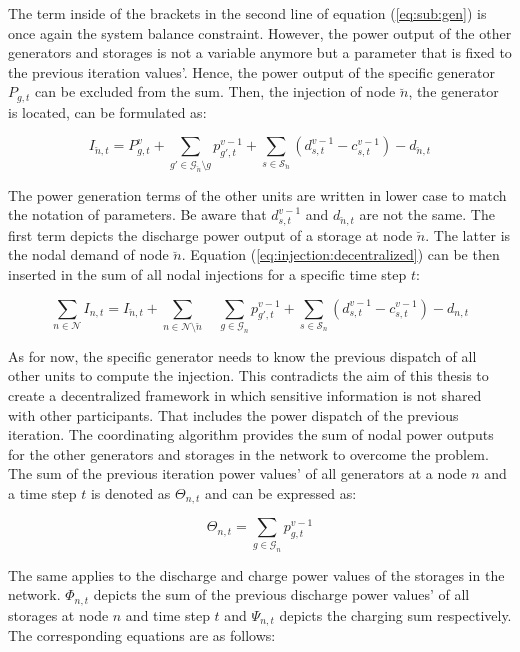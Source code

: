 The term inside of the brackets in the second line of equation (\ref{eq:sub:gen}) is once again the system balance constraint. However, the power output of the other generators and storages is not a variable anymore but a parameter that is fixed to the previous iteration values'. Hence, the power output of the specific generator $P_{g,t}$ can be excluded from the sum. Then, the injection of node $\breve{n}$, the generator is located, can be formulated as:
 
 \begin{equation}
	I_{\breve{n},t} = P_{g,t}^v + \sum_{g'\in\mathcal{G}_{\breve{n}} \setminus g}p_{g',t}^{v-1} + \sum_{s\in\mathcal{S}_{\breve{n}}}(d_{s,t}^{v-1}-c_{s,t}^{v-1})-d_{\breve{n},t}
	\label{eq:injection:decentralized}
\end{equation} 
 
 The power generation terms of the other units are written in lower case to match the notation of parameters. Be aware that $d_{s,t}^{v-1}$ and $d_{\breve{n},t}$ are not the same. The first term depicts the discharge power output of a storage at node $\breve{n}$. The latter is the nodal demand of node $\breve{n}$. Equation (\ref{eq:injection:decentralized}) can be then inserted in the sum of all nodal injections for a specific time step $t$:
 
 \begin{equation}
 	\sum_{n \in \mathcal{N}} I_{n,t} = I_{\breve{n},t} + \sum_{n \in \mathcal{N} \setminus \breve{n}} \quad \sum_{g\in\mathcal{G}_n}p_{g',t}^{v-1} + \sum_{s\in\mathcal{S}_n}(d_{s,t}^{v-1}-c_{s,t}^{v-1})-d_{n,t}
 \end{equation}
 
 As for now, the specific generator needs to know the previous dispatch of all other units to compute the injection. This contradicts the aim of this thesis to create a decentralized framework in which sensitive information is not shared with other participants. That includes the power dispatch of the previous iteration. The coordinating algorithm provides the sum of nodal power outputs for the other generators and storages in the network to overcome the problem. The sum of the previous iteration power values' of all generators at a node $n$ and a time step $t$ is denoted as $\Theta_{n,t}$ and can be expressed as:
 
 \begin{equation}
 	\Theta_{n,t} = \sum_{g\in\mathcal{G}_{n}}p_{g,t}^{v-1}
 \end{equation}
 
 The same applies to the discharge and charge power values of the storages in the network. $\Phi_{n,t}$ depicts the sum of the previous discharge power values' of all storages at node $n$ and time step $t$ and $\Psi_{n,t}$ depicts the charging sum respectively. The corresponding equations are as follows:
 
